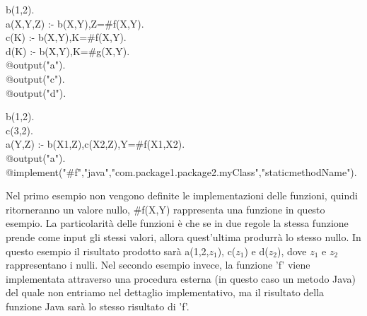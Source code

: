 \begin{algorithm}[h]
	b(1,2). \\
	a(X,Y,Z) :- b(X,Y),Z=\#f(X,Y). \\
	c(K) :- b(X,Y),K=\#f(X,Y). \\
	d(K) :- b(X,Y),K=\#g(X,Y). \\
	@output("a"). \\
	@output("c"). \\
	@output("d"). \\
\end{algorithm}

\begin{algorithm}[h]
	b(1,2). \\
	c(3,2). \\
	a(Y,Z) :- b(X1,Z),c(X2,Z),Y=\#f(X1,X2). \\
	@output("a"). \\
	@implement("\#f","java","com.package1.package2.myClass","staticmethodName").
\end{algorithm}

Nel primo esempio non vengono definite le implementazioni delle funzioni, quindi ritorneranno un valore nullo, \#f(X,Y) rappresenta una funzione in questo esempio. La particolarità delle funzioni è che se in due regole la stessa funzione prende come input gli stessi valori, allora quest'ultima produrrà lo stesso nullo. In questo esempio il risultato prodotto sarà a(1,2,$z_{1}$), c($z_{1}$) e d($z_{2}$), dove $z_{1}$ e $z_{2}$ rappresentano i nulli. 
Nel secondo esempio invece, la funzione 'f' viene implementata attraverso una procedura esterna (in questo caso un metodo Java) del quale non entriamo nel dettaglio implementativo, ma il risultato della funzione Java sarà lo stesso risultato di 'f'.
 
